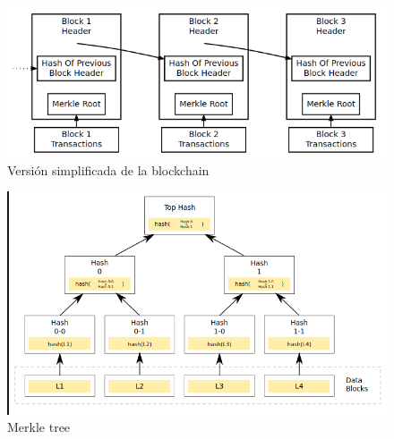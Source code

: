 \begin{figure}[h]
  \centering
  \includegraphics[scale=0.3]{figures/blockchain.png}
  \caption{Versión simplificada de la blockchain}
  \label{fig:blockchain}
\end{figure}

\begin{figure}[h]
  \centering
  \includegraphics[scale=0.3]{figures/merkle-tree.png}
  \caption{Merkle tree}
  \label{fig:merkle-tree}
\end{figure}




